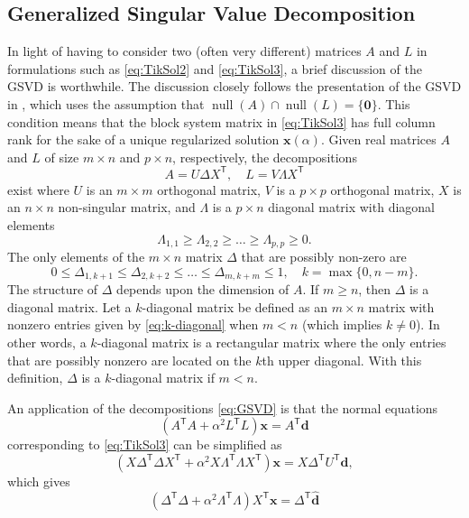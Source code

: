 \documentclass[12pt]{article}
\newcommand{\dVec}{\mathbf{d}}	%
\newcommand{\xVec}{\mathbf{x}}	%
\newcommand{\trans}[1]{{#1}^\mathsf{T}}	%
\DeclareMathOperator{\nullspace}{null}	%
\newcommand{\regparam}{\alpha}  %
\newcommand{\zeroVec}{\bm{0}}	%
\newcommand{\svd}[1]{\widehat{#1}}	%
\begin{document}
\subsection{Generalized Singular Value Decomposition} \label{sec:GSVD}
In light of having to consider two (often very different) matrices $A$ and $L$ in formulations such as \eqref{eq:TikSol2} and \eqref{eq:TikSol3}, a brief discussion of the GSVD is worthwhile. The discussion closely follows the presentation of the GSVD in \cite{ABT}, which uses the assumption that $\nullspace(A) \cap \nullspace(L) = \{\zeroVec\}$. This condition means that the block system matrix in \eqref{eq:TikSol3} has full column rank for the sake of a unique regularized solution $\xVec(\regparam)$. Given real matrices $A$ and $L$ of size $m \times n$ and $p \times n$, respectively, the decompositions
\begin{equation}
\label{eq:GSVD}
A = U\Delta\trans{X}, \quad L = V\Lambda\trans{X}
\end{equation}
exist where $U$ is an $m \times m$ orthogonal matrix, $V$ is a $p \times p$ orthogonal matrix, $X$ is an $n \times n$ non-singular matrix, and $\Lambda$ is a $p \times n$ diagonal matrix with diagonal elements
\[\Lambda_{1,1} \geq \Lambda_{2,2} \geq \ldots \geq \Lambda_{p,p} \geq 0.\]
The only elements of the $m \times n$ matrix $\Delta$ that are possibly non-zero are
\begin{equation}
\label{eq:k-diagonal}
 0 \leq \Delta_{1,k+1} \leq \Delta_{2,k+2} \leq \ldots \leq \Delta_{m,k+m} \leq 1, \quad k = \max \{0,n-m\}.
\end{equation}
The structure of $\Delta$ depends upon the dimension of $A$. If $m \geq n$, then $\Delta$ is a diagonal matrix. Let a $k$-diagonal matrix be defined as an $m \times n$ matrix with nonzero entries given by \eqref{eq:k-diagonal} when $m < n$ (which implies $k \neq 0$). In other words, a $k$-diagonal matrix is a rectangular matrix where the only entries that are possibly nonzero are located on the $k$th upper diagonal. With this definition, $\Delta$ is a $k$-diagonal matrix if $m < n$. \par 
An application of the decompositions \eqref{eq:GSVD} is that the normal equations 
\[(\trans{A}A + \regparam^2 \trans{L}L)\xVec = \trans{A}\dVec\] corresponding to \eqref{eq:TikSol3} can be simplified as 
\[(X\trans{\Delta}\Delta\trans{X} + \regparam^2 X\trans{\Lambda}\Lambda\trans{X})\xVec = X\trans{\Delta}\trans{U}\dVec,\]
which gives 
\[(\trans{\Delta}\Delta + \regparam^2 \trans{\Lambda}\Lambda)\trans{X}\xVec = \trans{\Delta}\svd{\dVec}\] 
\end{document}

